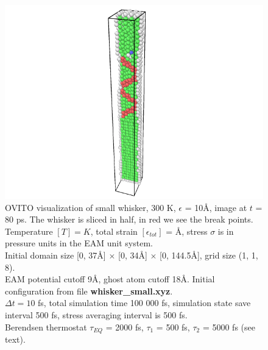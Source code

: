 \documentclass[12pt,a4paper]{article}
\begin{document}
\begin{figure}[h!]
	\centering
	\includegraphics[width=.85\linewidth]{img/milestone09-small-300-10-pic.png}
	\caption{OVITO visualization of small whisker, 300 K, $\epsilon$ = 10Å,  image at $t$ = 80 ps. The whisker is sliced in half, in red we see the break points.\\
	Temperature $[T]=K$, total strain $[\epsilon_{tot}]$ = Å, stress $\sigma$ is in pressure units in the EAM unit system.\\
	Initial domain size [0, 37Å] $\times$ [0, 34Å] $\times$ [0, 144.5Å], grid size (1, 1, 8).\\
	EAM potential cutoff 9Å, ghost atom cutoff 18Å. Initial configuration from file {\bf whisker\_small.xyz}.\\
	$\Delta t = 10$ fs, total simulation time 100 000 fs, simulation state save interval 500 fs, stress averaging interval is 500 fs.\\
	Berendsen thermostat $\tau_{EQ}$ = 2000 fs, $\tau_1$ = 500 fs, $\tau_2$ = 5000 fs (see text).
	}
	\label{fig:whisker-small-defect}
\end{figure}
\end{document}
